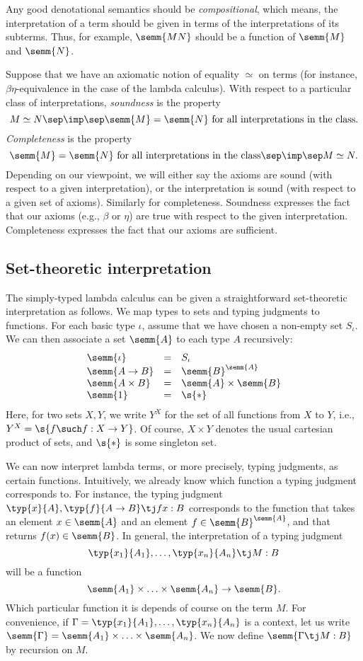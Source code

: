 \documentclass[12pt]{article}
\begin{document}
Any good denotational semantics should be {\em compositional}, which
means, the interpretation of a term should be given in terms of the
interpretations of its subterms. Thus, for example, $\semm{MN}$
should be a function of $\semm{M}$ and $\semm{N}$. 

Suppose that we have an axiomatic notion of equality $\simeq$ on terms
(for instance, $\beta\eta$-equivalence in the case of the lambda
calculus). With respect to a particular class of interpretations, {\em
  soundness} is the property
\[      M\simeq N \sep\imp\sep \semm{M}=\semm{N} \mbox{ for all
  interpretations in the class}.
\]
{\em Completeness} is the property
\[      \semm{M}=\semm{N} \mbox{ for all
  interpretations in the class} \sep\imp\sep M\simeq N.
\]
Depending on our viewpoint, we will either say the axioms are sound
(with respect to a given interpretation), or the interpretation is
sound (with respect to a given set of axioms). Similarly for
completeness. Soundness expresses the fact that our axioms (e.g.,
$\beta$ or $\eta$) are true with respect to the given interpretation. 
Completeness expresses the fact that our axioms are sufficient.

\subsection{Set-theoretic interpretation}

The simply-typed lambda calculus can be given a straightforward
set-theoretic interpretation as follows. We map types to sets and
typing judgments to functions. For each basic type $\iota$, assume
that we have chosen a non-empty set $S_{\iota}$. We can then associate
a set $\semm{A}$ to each type $A$ recursively:
\[ \begin{array}{lll}
  \semm{\iota} &=& S_{\iota} \\
  \semm{A\to B} &=& \semm{B}^{\semm{A}} \\
  \semm{A\times B} &=& \semm{A}\times\semm{B} \\
  \semm{1} &=& \s{*}
\end{array}
\]
Here, for two sets $X,Y$, we write $Y^X$ for the set of all functions
from $X$ to $Y$, i.e., $Y^X=\s{f\such f:X\to Y}$. Of course, $X\times
Y$ denotes the usual cartesian product of sets, and $\s{*}$ is some
singleton set. 

We can now interpret lambda terms, or more precisely, typing
judgments, as certain functions. Intuitively, we already know which
function a typing judgment corresponds to. For instance, the typing
judgment $\typ{x}{A},\typ{f}{A\to B}\tj fx:B$ corresponds to the
function that takes an element $x\in\semm{A}$ and an element
$f\in\semm{B}^{\semm{A}}$, and that returns $f(x)\in\semm{B}$. In
general, the interpretation of a typing judgment
\[     \typ{x_1}{A_1},\ldots,\typ{x_n}{A_n} \tj M:B
\]
will be a function
\[     \semm{A_1}\times\ldots\times\semm{A_n} \to \semm{B}.
\]
Which particular function it is depends of course on the term $M$. 
For convenience, if $\Gamma=\typ{x_1}{A_1},\ldots,\typ{x_n}{A_n}$ is a
context, let us write $\semm{\Gamma}=\semm{A_1}\times\ldots\times\semm{A_n}$. 
We now define $\semm{\Gamma\tj M:B}$ by recursion on $M$.
\end{document}
